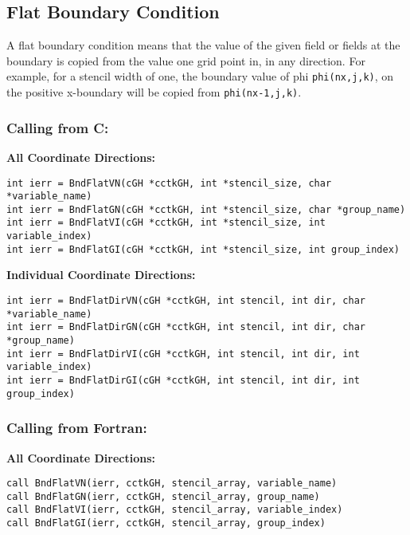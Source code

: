 \documentclass{article}
\begin{document}
\subsection{Flat Boundary Condition}

A flat boundary condition means that the value of the given 
field or fields at the boundary is copied from the value one grid point in,
in any direction. For example, for a stencil width of one, the
boundary value of phi {\tt phi(nx,j,k)}, on the positive x-boundary will
be copied from {\tt phi(nx-1,j,k)}. 

\subsubsection*{Calling from C:}

{\bf All Coordinate Directions:}
\begin{verbatim}
int ierr = BndFlatVN(cGH *cctkGH, int *stencil_size, char *variable_name)
int ierr = BndFlatGN(cGH *cctkGH, int *stencil_size, char *group_name)
int ierr = BndFlatVI(cGH *cctkGH, int *stencil_size, int variable_index)
int ierr = BndFlatGI(cGH *cctkGH, int *stencil_size, int group_index)
\end{verbatim}

{\bf Individual Coordinate Directions:}
\begin{verbatim}
int ierr = BndFlatDirVN(cGH *cctkGH, int stencil, int dir, char *variable_name)
int ierr = BndFlatDirGN(cGH *cctkGH, int stencil, int dir, char *group_name)
int ierr = BndFlatDirVI(cGH *cctkGH, int stencil, int dir, int variable_index)
int ierr = BndFlatDirGI(cGH *cctkGH, int stencil, int dir, int group_index)
\end{verbatim}

\subsubsection*{Calling from Fortran:}

{\bf All Coordinate Directions:}
\begin{verbatim}
call BndFlatVN(ierr, cctkGH, stencil_array, variable_name)
call BndFlatGN(ierr, cctkGH, stencil_array, group_name)
call BndFlatVI(ierr, cctkGH, stencil_array, variable_index)
call BndFlatGI(ierr, cctkGH, stencil_array, group_index)
\end{verbatim}
\end{document}
